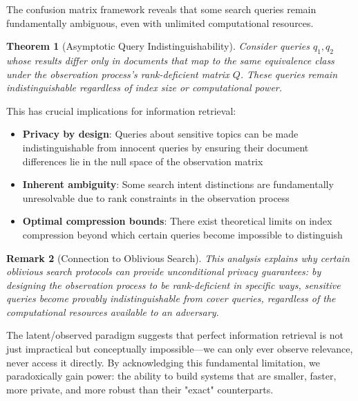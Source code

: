\documentclass[11pt,final,hidelinks]{article}
\newtheorem{theorem}{Theorem}[section]
\newtheorem{remark}[theorem]{Remark}
\begin{document}
The confusion matrix framework reveals that some search queries remain fundamentally ambiguous, even with unlimited computational resources.

\begin{theorem}[Asymptotic Query Indistinguishability]
Consider queries $q_1, q_2$ whose results differ only in documents that map to the same equivalence class under the observation process's rank-deficient matrix $Q$. These queries remain indistinguishable regardless of index size or computational power.
\end{theorem}

This has crucial implications for information retrieval:

\begin{itemize}
    \item \textbf{Privacy by design}: Queries about sensitive topics can be made indistinguishable from innocent queries by ensuring their document differences lie in the null space of the observation matrix
    \item \textbf{Inherent ambiguity}: Some search intent distinctions are fundamentally unresolvable due to rank constraints in the observation process
    \item \textbf{Optimal compression bounds}: There exist theoretical limits on index compression beyond which certain queries become impossible to distinguish
\end{itemize}

\begin{remark}[Connection to Oblivious Search]
This analysis explains why certain oblivious search protocols can provide unconditional privacy guarantees: by designing the observation process to be rank-deficient in specific ways, sensitive queries become provably indistinguishable from cover queries, regardless of the computational resources available to an adversary.
\end{remark}

The latent/observed paradigm suggests that perfect information retrieval is not just impractical but conceptually impossible—we can only ever observe relevance, never access it directly. By acknowledging this fundamental limitation, we paradoxically gain power: the ability to build systems that are smaller, faster, more private, and more robust than their "exact" counterparts.




\end{document}
